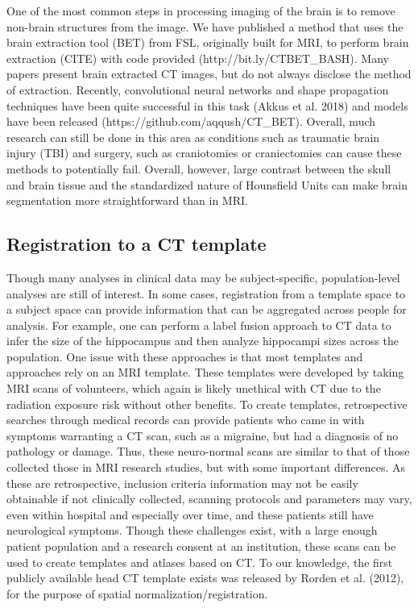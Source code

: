 \documentclass[]{elsarticle} %
\begin{document}
One of the most common steps in processing imaging of the brain is to
remove non-brain structures from the image. We have published a method
that uses the brain extraction tool (BET) from FSL, originally built for
MRI, to perform brain extraction (CITE) with code provided
(http://bit.ly/CTBET\_BASH). Many papers present brain extracted CT
images, but do not always disclose the method of extraction. Recently,
convolutional neural networks and shape propagation techniques have been
quite successful in this task (Akkus et al. 2018) and models have been
released (https://github.com/aqqush/CT\_BET). Overall, much research can
still be done in this area as conditions such as traumatic brain injury
(TBI) and surgery, such as craniotomies or craniectomies can cause these
methods to potentially fail. Overall, however, large contrast between
the skull and brain tissue and the standardized nature of Hounsfield
Units can make brain segmentation more straightforward than in MRI.

\hypertarget{registration-to-a-ct-template}{%
\subsection{Registration to a CT
template}\label{registration-to-a-ct-template}}

Though many analyses in clinical data may be subject-specific,
population-level analyses are still of interest. In some cases,
registration from a template space to a subject space can provide
information that can be aggregated across people for analysis. For
example, one can perform a label fusion approach to CT data to infer the
size of the hippocampus and then analyze hippocampi sizes across the
population. One issue with these approaches is that most templates and
approaches rely on an MRI template. These templates were developed by
taking MRI scans of volunteers, which again is likely unethical with CT
due to the radiation exposure risk without other benefits. To create
templates, retrospective searches through medical records can provide
patients who came in with symptoms warranting a CT scan, such as a
migraine, but had a diagnosis of no pathology or damage. Thus, these
neuro-normal scans are similar to that of those collected those in MRI
research studies, but with some important differences. As these are
retrospective, inclusion criteria information may not be easily
obtainable if not clinically collected, scanning protocols and
parameters may vary, even within hospital and especially over time, and
these patients still have neurological symptoms. Though these challenges
exist, with a large enough patient population and a research consent at
an institution, these scans can be used to create templates and atlases
based on CT. To our knowledge, the first publicly available head CT
template exists was released by Rorden et al. (2012), for the purpose of
spatial normalization/registration.
\end{document}
